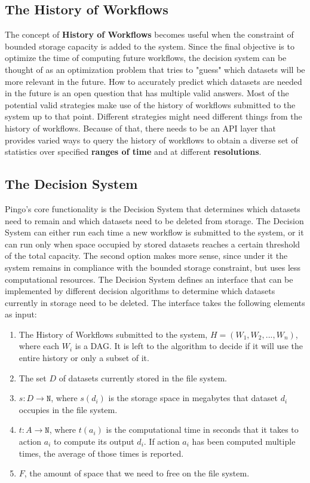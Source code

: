 \subsection{The History of Workflows}
The concept of \textbf{History of Workflows} becomes useful when the constraint of bounded storage capacity is added to the system. Since the final objective is to optimize the time of computing future workflows, the decision system can be thought of as an optimization problem that tries to "guess" which datasets will be more relevant in the future. How to accurately predict which datasets are needed in the future is an open question that has multiple valid answers. Most of the potential valid strategies make use of the history of workflows submitted to the system up to that point.  Different strategies might need different things from the history of workflows. Because of that, there needs to be an API layer that provides varied ways to query the history of workflows to obtain a diverse set of statistics over specified \textbf{ranges of time} and at different \textbf{resolutions}.

\subsection{The Decision System}
\label{sec:decision_system}
Pingo's core functionality is the Decision System that determines which datasets need to remain and which datasets need to be deleted from storage.  The Decision System can either run each time a new workflow is submitted to the system, or it can run only when space occupied by stored datasets reaches a certain threshold of the total capacity.  The second option makes more sense, since under it the system remains in compliance with the bounded storage constraint, but uses less computational resources. The Decision System defines an interface that can be implemented by different decision algorithms to determine which datasets currently in storage need to be deleted. The interface takes the following elements as input:

\begin{enumerate}
\item The History of Workflows submitted to the system, $H = (W_1, W_2, ..., W_n)$, where each $W_i$ is a DAG. It is left to the algorithm to decide if it will use the entire history or only a subset of it.

\item The set $D$ of datasets currently stored in the file system. 

\item $s: D \to \mathtt{N} $, where $s(d_i)$ is the storage space in megabytes that dataset $d_i$ occupies in the file system.

\item $t: A \to \mathtt{N}$, where $t(a_i)$ is the computational time in seconds that it takes to action $a_i$ to compute its output $d_i$.  If action $a_i$ has been computed multiple times, the average of those times is reported.

\item $F$, the amount of space that we need to free on the file system.

\end{enumerate}

